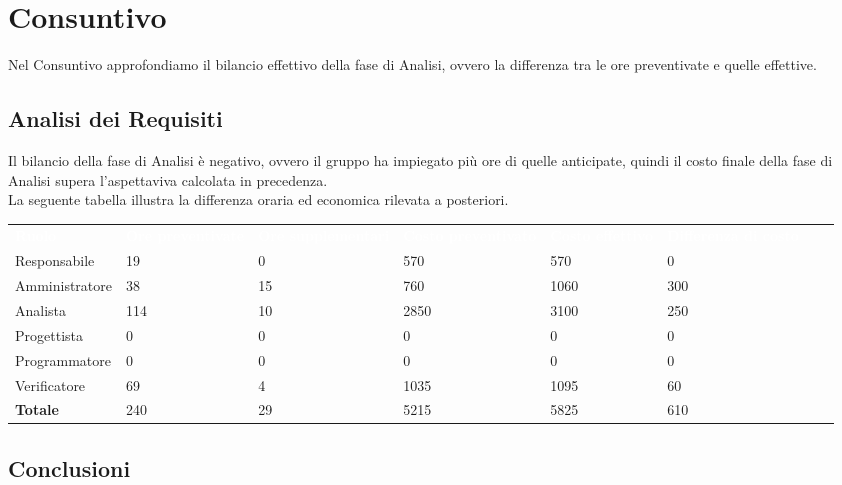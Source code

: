 \section{Consuntivo}

Nel Consuntivo approfondiamo il bilancio effettivo della fase di Analisi, ovvero la differenza tra le ore preventivate e quelle effettive.

\subsection{Analisi dei Requisiti}

Il bilancio della fase di Analisi è negativo, ovvero il gruppo ha impiegato più ore di quelle anticipate, quindi il costo finale della fase di Analisi supera l'aspettaviva calcolata in precedenza.\\
La seguente tabella illustra la differenza oraria ed economica rilevata a posteriori.

\renewcommand{\arraystretch}{2}
\centering
\begin{longtable}{ C{5cm} C{1cm} C{1cm} C{1cm} C{1cm} C{1cm} C{1cm} C{3cm}}
	\textcolor{white}{\textbf{Ruolo}} & \textcolor{white}{\textbf{Ore preventivate}} & \textcolor{white}{\textbf{Ore supplementari}} & \textcolor{white}{\textbf{Costo preventivato}} & \textcolor{white}{\textbf{Costo effettivo}} & \textcolor{white}{\textbf{Differenza di costo}}\\	
	
	Responsabile & 19 & 0 & 570 & 570 & 0 \\
	Amministratore & 38 & 15 & 760 & 1060 & 300 \\
	Analista & 114 & 10 & 2850 & 3100 & 250 \\
	Progettista & 0 & 0 & 0 & 0 & 0 \\
	Programmatore & 0 & 0 & 0 & 0 & 0 \\
	Verificatore & 69 & 4 & 1035 & 1095 & 60 \\
	\textbf{Totale} & 240 & 29 & 5215 & 5825 & 610 \\	
	
\end{longtable}

\subsection{Conclusioni}

